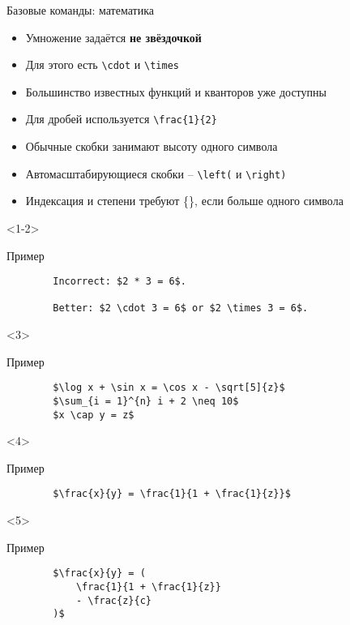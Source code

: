 \begin{frame}[fragile]{Базовые команды: математика}

\begin{itemize}[<+->]
    \item Умножение задаётся \textbf{не звёздочкой}
    \item Для этого есть \lstinline!\cdot! и \lstinline!\times!
    \item Большинство известных функций и кванторов уже доступны
    \item Для дробей используется \lstinline!\frac{1}{2}!
    \item Обычные скобки занимают высоту одного символа
    \item Автомасштабирующиеся скобки -- \lstinline!\left(! и \lstinline!\right)!
    \item Индексация и степени требуют \{\}, если больше одного символа
\end{itemize}

\begin{onlyenv}<1-2>
    \begin{block}{Пример}
        \begin{lstlisting}
        Incorrect: $2 * 3 = 6$.
        
        Better: $2 \cdot 3 = 6$ or $2 \times 3 = 6$.
        \end{lstlisting}
    \end{block}
\end{onlyenv}

\begin{onlyenv}<3>
    \begin{block}{Пример}
        \begin{lstlisting}
        $\log x + \sin x = \cos x - \sqrt[5]{z}$
        $\sum_{i = 1}^{n} i + 2 \neq 10$
        $x \cap y = z$
        \end{lstlisting}
    \end{block}
\end{onlyenv}

\begin{onlyenv}<4>
    \begin{block}{Пример}
        \begin{lstlisting}
        $\frac{x}{y} = \frac{1}{1 + \frac{1}{z}}$
        \end{lstlisting}
    \end{block}
\end{onlyenv}

\begin{onlyenv}<5>
    \begin{block}{Пример}
        \begin{lstlisting}
        $\frac{x}{y} = (
            \frac{1}{1 + \frac{1}{z}}
            - \frac{z}{c}
        )$
        \end{lstlisting}
    \end{block}
\end{onlyenv}


\end{frame}
